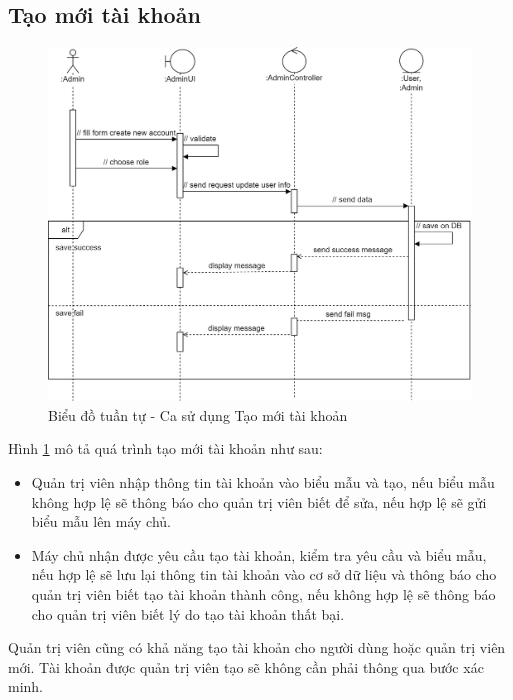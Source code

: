 \documentclass[./../main.tex]{subfiles}
\begin{document}
\subsection{Tạo mới tài khoản}
\begin{figure}[H]
	\centering
	\includegraphics[width=\linewidth]{./img/uc21.png}
	\caption{\label{tab:seq-uc13}Biểu đồ tuần tự - Ca sử dụng Tạo mới tài khoản}
\end{figure}
Hình \ref{tab:seq-uc13} mô tả quá trình tạo mới tài khoản như sau:
\begin{itemize}
    \item Quản trị viên nhập thông tin tài khoản vào biểu mẫu và tạo, nếu biểu mẫu không hợp lệ sẽ thông báo cho quản trị viên biết để sửa, nếu hợp lệ sẽ gửi biểu mẫu lên máy chủ.
    \item Máy chủ nhận được yêu cầu tạo tài khoản, kiểm tra yêu cầu và biểu mẫu, nếu hợp lệ sẽ lưu lại thông tin tài khoản vào cơ sở dữ liệu và thông báo cho quản trị viên biết tạo tài khoản thành công, nếu không hợp lệ sẽ thông báo cho quản trị viên biết lý do tạo tài khoản thất bại.
\end{itemize}

Quản trị viên cũng có khả năng tạo tài khoản cho người dùng hoặc quản trị viên mới. Tài khoản được quản trị viên tạo sẽ không cần phải thông qua bước xác minh.
\end{document}
